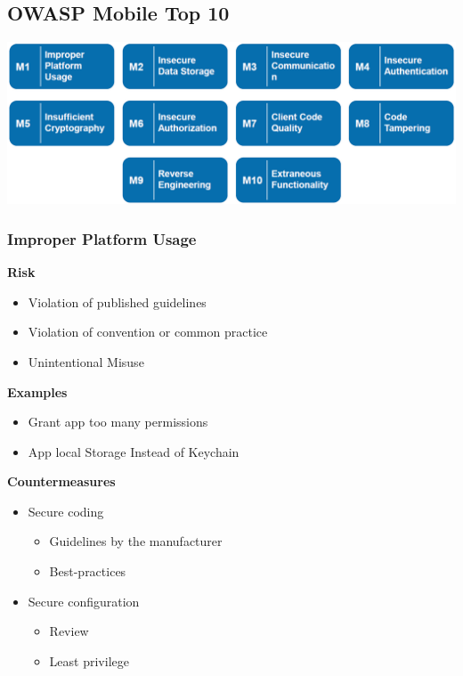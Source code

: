 \usepackage{graphicx}%

\subsection{OWASP Mobile Top 10}
\includegraphics[width=\linewidth]{../img/owasp_mobile.png}

\subsubsection{Improper Platform Usage}
\textbf{Risk}
\begin{itemize}
    \item Violation of published guidelines
    \item Violation of convention or common practice
    \item Unintentional Misuse
\end{itemize}
\textbf{Examples}
\begin{itemize}
    \item Grant app too many permissions
    \item App local Storage Instead of Keychain
\end{itemize}
\textbf{Countermeasures}
\begin{itemize}
    \item Secure coding
    \begin{itemize}
        \item Guidelines by the manufacturer
        \item Best-practices
    \end{itemize}
    \item Secure configuration
    \begin{itemize}
        \item Review
        \item Least privilege
    \end{itemize}
\end{itemize}


